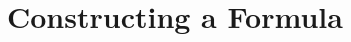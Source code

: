 \documentclass[../main/thesis.tex]{subfiles}
\begin{document}
\section{Constructing a Formula}
\label{sec:translating-formulas-to-FPR}

\end{document}
